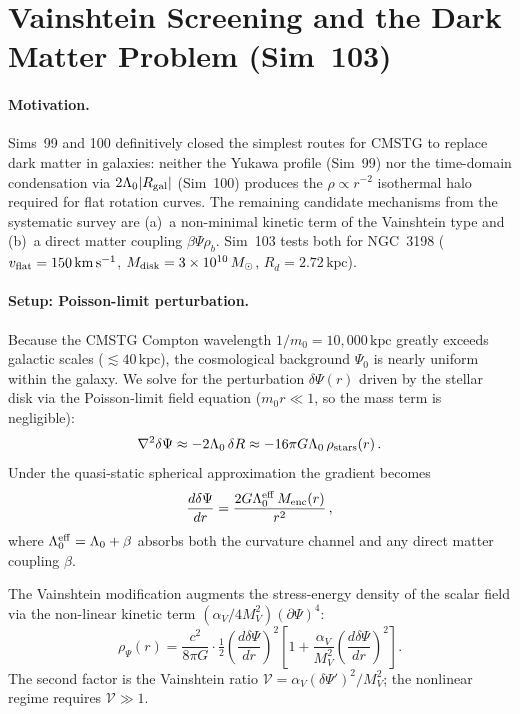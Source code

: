 \documentclass[12pt,a4paper]{article}
\begin{document}
\section{Vainshtein Screening and the Dark Matter Problem (Sim~103)}
\label{sec:sim103}

\paragraph{Motivation.}
Sims~99 and 100 definitively closed the simplest routes for CMSTG to replace dark
matter in galaxies: neither the Yukawa profile (Sim~99) nor the time-domain
condensation via $2\Lambda_0|R_{\rm gal}|$ (Sim~100) produces the $\rho\propto r^{-2}$
isothermal halo required for flat rotation curves.  The remaining candidate
mechanisms from the systematic survey are (a)~a non-minimal kinetic term of the
Vainshtein type and (b)~a direct matter coupling $\beta\Psi\rho_b$.
Sim~103 tests both for NGC~3198 ($v_{\rm flat} = 150\,\mathrm{km\,s^{-1}}$,
$M_{\rm disk} = 3\times 10^{10}\,M_\odot$, $R_d = 2.72\,\mathrm{kpc}$).

\paragraph{Setup: Poisson-limit perturbation.}
Because the CMSTG Compton wavelength $1/m_0 = 10{,}000\,\mathrm{kpc}$ greatly exceeds
galactic scales ($\lesssim 40\,\mathrm{kpc}$), the cosmological background
$\Psi_0$ is nearly uniform within the galaxy.  We solve for the perturbation
$\delta\Psi(r)$ driven by the stellar disk via the Poisson-limit field equation
($m_0 r \ll 1$, so the mass term is negligible):
\begin{equation}
\nabla^2\delta\Psi \approx -2\Lambda_0\,\delta R \approx
  -16\pi G\Lambda_0\,\rho_{\rm stars}(r)\,.
\end{equation}
Under the quasi-static spherical approximation the gradient becomes
\begin{equation}
\frac{d\delta\Psi}{dr} = \frac{2G\Lambda_0^{\rm eff}\,M_{\rm enc}(r)}{r^2}\,,
\label{eq:dPsi_poisson}
\end{equation}
where $\Lambda_0^{\rm eff} = \Lambda_0 + \beta$ absorbs both the curvature channel
and any direct matter coupling $\beta$.

The Vainshtein modification augments the stress-energy density of the scalar field via
the non-linear kinetic term $(\alpha_V/4M_V^2)(\partial\Psi)^4$:
\begin{equation}
\rho_\Psi(r) = \frac{c^2}{8\pi G}
  \cdot\tfrac{1}{2}\!\left(\frac{d\delta\Psi}{dr}\right)^{\!2}
  \left[1 + \frac{\alpha_V}{M_V^2}\!\left(\frac{d\delta\Psi}{dr}\right)^{\!2}\right].
\label{eq:rho_Vainshtein}
\end{equation}
The second factor is the Vainshtein ratio $\mathcal{V} = \alpha_V(\delta\Psi')^2/M_V^2$;
the nonlinear regime requires $\mathcal{V} \gg 1$.
\end{document}
